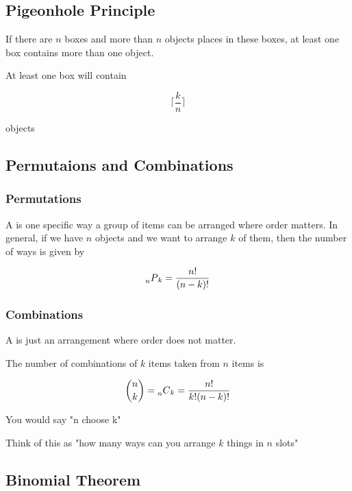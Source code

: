 \documentclass[../../Main.tex]{subfiles}
\begin{document}
\subsection{Pigeonhole Principle}

\begin{definition}
    If there are $n$ boxes and more than $n$ objects places in these boxes, at least one box contains more than one object.

    At least one box will contain 

    $$\lceil \frac{k}{n} \rceil$$

    objects
\end{definition}

\subsection{Permutaions and Combinations}

\subsubsection{Permutations}

\begin{definition}[Permutation]
    A  is one specific way a group of items can be arranged where order matters. 
    In general, if we have $n$ objects and we want to arrange $k$ of them, then the number of ways is given by

    $$\prescript{}{n}{P}_k = \frac{n!}{(n - k)!}$$
\end{definition}

\subsubsection{Combinations}

\begin{definition}[Combination]
    A  is just an arrangement where order does not matter.

    The number of combinations of $k$ items taken from $n$ items is

    $${n \choose k} = \prescript{}{n}{C}_k = \frac{n!}{k!(n - k)!}$$

    You would say "n choose k"

    Think of this as "how many ways can you arrange $k$ things in $n$ slots"
\end{definition}

\subsection{Binomial Theorem}
\end{document}
